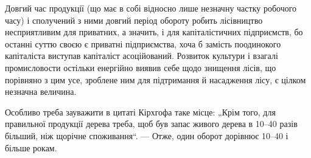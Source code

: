 Довгий час продукції (що має в собі відносно лише незначну частку робочого часу) і сполучений з ними
довгий період обороту робить лісівництво несприятливим для приватних, а значить, і для
капіталістичних підприємств, бо останні суттю своєю є приватні підприємства, хоча б замість
поодинокого капіталіста виступав капіталіст асоційований. Розвиток культури і взагалі промисловости
остільки енергійно виявив себе щодо знищення лісів, що порівняно з цим усе, зроблене ним для
підтримання й насадження лісу, є цілком незначна величина.

Особливо треба зауважити в цитаті Кірхгофа таке місце: „Крім того, для правильної продукції дерева
треба, щоб був запас живого дерева в 10--40 разів більший, ніж щорічне споживання“. — Отже, один
оборот дорівнює 10--40 і більше рокам.
